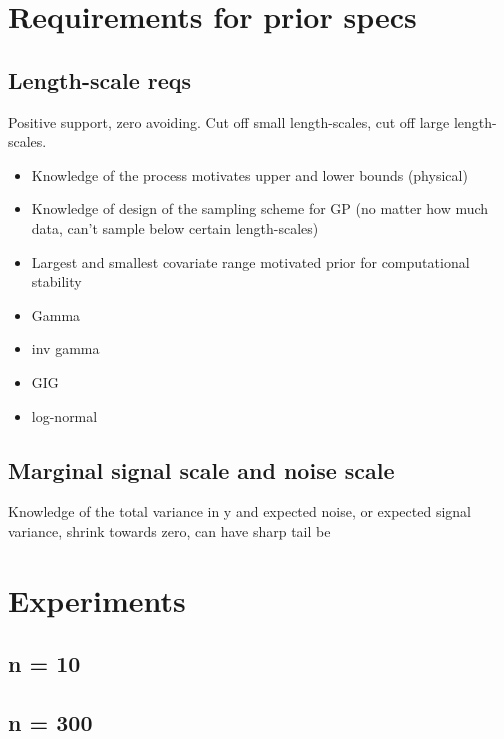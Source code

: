 \documentclass{article}
\begin{document}
\section{Requirements for prior specs}

\subsection{Length-scale reqs}

Positive support, zero avoiding. Cut off small length-scales, cut off large
length-scales.

\begin{itemize}
  \item Knowledge of the process motivates upper and lower bounds (physical)
  \item Knowledge of design of the sampling scheme for GP (no matter how much data, can't sample below certain length-scales)
  \item Largest and smallest covariate range motivated prior for computational stability
\end{itemize}

\begin{itemize}
  \item Gamma
  \item inv gamma
  \item GIG
  \item log-normal
\end{itemize}

\subsection{Marginal signal scale and noise scale}

Knowledge of the total variance in y and expected noise, or expected signal
variance, shrink towards zero, can have sharp tail be

\section{Experiments}

\subsection{n = 10}

\subsection{n = 300}
\end{document}
